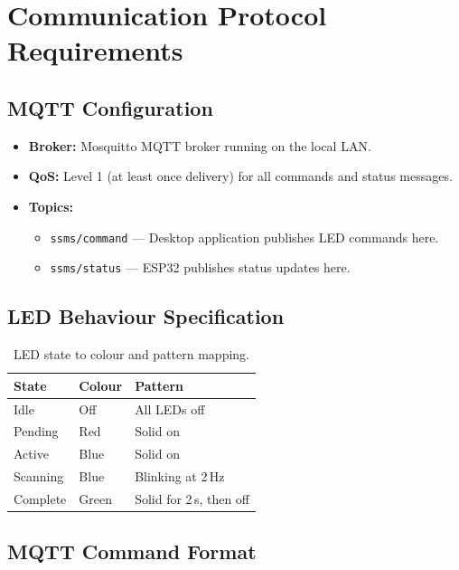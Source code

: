 \section{Communication Protocol Requirements}
\label{sec:mqtt-req}

\subsection{MQTT Configuration}
\label{sec:mqtt-config}

\begin{itemize}
  \item \textbf{Broker:} Mosquitto MQTT broker running on the local LAN.
  \item \textbf{QoS:} Level 1 (at least once delivery) for all commands and status messages.
  \item \textbf{Topics:}
  \begin{itemize}
    \item \texttt{ssms/command} --- Desktop application publishes LED commands here.
    \item \texttt{ssms/status} --- ESP32 publishes status updates here.
  \end{itemize}
\end{itemize}

\subsection{LED Behaviour Specification}
\label{sec:led-behaviour}

\begin{table}[H]
  \centering
  \caption{LED state to colour and pattern mapping.}
  \label{tab:led-behaviour}
  \begin{tabular}{p{2.5cm} p{2.5cm} p{5cm}}
    \toprule
    \textbf{State} & \textbf{Colour} & \textbf{Pattern} \\
    \midrule
    Idle & Off & All LEDs off \\
    Pending & Red & Solid on \\
    Active & Blue & Solid on \\
    Scanning & Blue & Blinking at 2\,Hz \\
    Complete & Green & Solid for 2\,s, then off \\
    \bottomrule
  \end{tabular}
\end{table}

\subsection{MQTT Command Format}
\label{sec:mqtt-commands}

